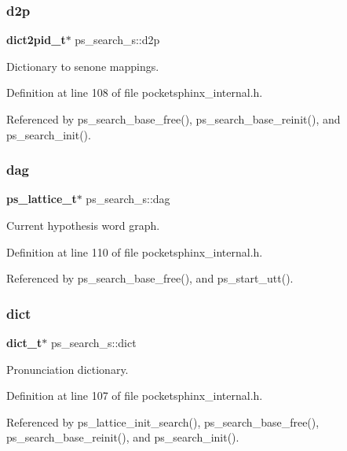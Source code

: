 \subsubsection{d2p}
{\footnotesize\ttfamily \textbf{ dict2pid\+\_\+t}$\ast$ ps\+\_\+search\+\_\+s\+::d2p}



Dictionary to senone mappings. 



Definition at line 108 of file pocketsphinx\+\_\+internal.\+h.



Referenced by ps\+\_\+search\+\_\+base\+\_\+free(), ps\+\_\+search\+\_\+base\+\_\+reinit(), and ps\+\_\+search\+\_\+init().

\mbox{\label{structps__search__s_a897f46c55d17e817ff1364f555b31463}} 
\subsubsection{dag}
{\footnotesize\ttfamily \textbf{ ps\+\_\+lattice\+\_\+t}$\ast$ ps\+\_\+search\+\_\+s\+::dag}



Current hypothesis word graph. 



Definition at line 110 of file pocketsphinx\+\_\+internal.\+h.



Referenced by ps\+\_\+search\+\_\+base\+\_\+free(), and ps\+\_\+start\+\_\+utt().

\mbox{\label{structps__search__s_a918f243fa966e72c47f697fb9e60089d}} 
\subsubsection{dict}
{\footnotesize\ttfamily \textbf{ dict\+\_\+t}$\ast$ ps\+\_\+search\+\_\+s\+::dict}



Pronunciation dictionary. 



Definition at line 107 of file pocketsphinx\+\_\+internal.\+h.



Referenced by ps\+\_\+lattice\+\_\+init\+\_\+search(), ps\+\_\+search\+\_\+base\+\_\+free(), ps\+\_\+search\+\_\+base\+\_\+reinit(), and ps\+\_\+search\+\_\+init().


